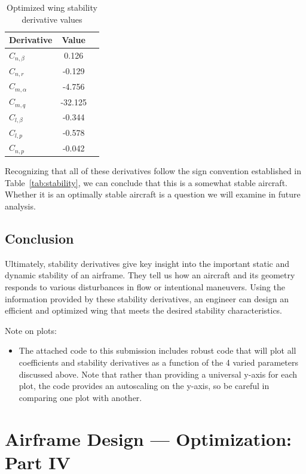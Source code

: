 \documentclass{report}
\begin{document}
\begin{table}[H]
    \centering
    \caption{Optimized wing stability derivative values}\label{tab:optimized_derivs}
    \begin{tabular}{l c c}
        \toprule
        \textbf{Derivative} & \textbf{Value} \\
        \midrule
        $C_{n,\beta}$ & 0.126 \\
        $C_{n,r}$ & -0.129 \\
        $C_{m,\alpha}$ & -4.756\\
        $C_{m,q}$ & -32.125 \\
        $C_{l,\beta}$ & -0.344 \\
        $C_{l,p}$ & -0.578 \\
        $C_{n,p}$ & -0.042\\
        \bottomrule
    \end{tabular}
\end{table}

Recognizing that all of these derivatives follow the sign convention established in Table~\ref{tab:stability}, we can conclude that this is a somewhat stable aircraft. Whether it is an optimally stable aircraft is a question we will examine in future analysis.


\section{Conclusion}
Ultimately, stability derivatives give key insight into the important static and dynamic stability of an airframe. 
They tell us how an aircraft and its geometry responds to various disturbances in flow or intentional maneuvers.
Using the information provided by these stability derivatives, an engineer can design an efficient and optimized wing that meets the desired stability characteristics.



Note on plots:
\begin{itemize}
    \item [-] The attached code to this submission includes robust code that will plot all coefficients and stability derivatives as a function of the 4 varied parameters discussed above. Note that rather than providing a universal y-axis for each plot, the code provides an autoscaling on the y-axis, so be careful in comparing one plot with another.
\end{itemize}

\chapter{Airframe Design --- Optimization: Part IV}
\end{document}
